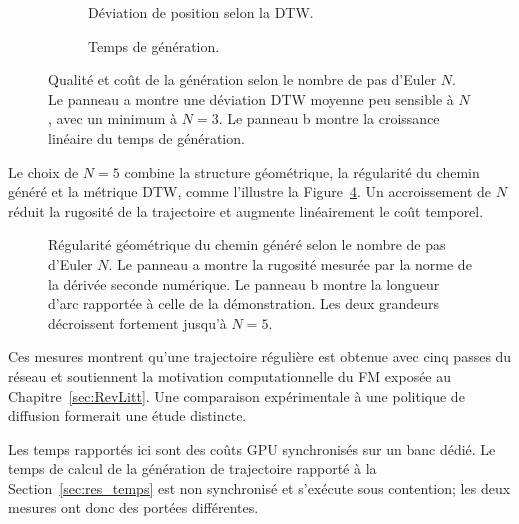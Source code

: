 \begin{figure}[!htbp]
    \centering
    \begin{subfigure}[b]{0.48\textwidth}
        \centering
        
        \caption{Déviation de position selon la \ac{DTW}.}\label{fig:fm_steps_dtw}
    \end{subfigure}
    \hfill
    \begin{subfigure}[b]{0.48\textwidth}
        \centering
        
        \caption{Temps de génération.}\label{fig:fm_steps_temps}
    \end{subfigure}
    \caption[Qualité et coût de la génération selon les pas d'Euler]{Qualité et coût de la génération selon le nombre de pas d'Euler $N$. Le panneau a montre une déviation \ac{DTW} moyenne peu sensible à $N$, avec un minimum à $N=3$. Le panneau b montre la croissance linéaire du temps de génération.}\label{fig:fm_euler_steps}
\end{figure}

Le choix de $N=5$ combine la structure géométrique, la régularité du chemin généré et la métrique \ac{DTW}, comme l'illustre la Figure~\ref{fig:fm_dispersion_structure}. Un accroissement de $N$ réduit la rugosité de la trajectoire et augmente linéairement le coût temporel.

\begin{figure}[!htbp]
    \centering
    
    \caption[Régularité géométrique du chemin selon les pas d'Euler]{Régularité géométrique du chemin généré selon le nombre de pas d'Euler $N$. Le panneau a montre la rugosité mesurée par la norme de la dérivée seconde numérique. Le panneau b montre la longueur d'arc rapportée à celle de la démonstration. Les deux grandeurs décroissent fortement jusqu'à $N=5$.}\label{fig:fm_dispersion_structure}
\end{figure}

Ces mesures montrent qu'une trajectoire régulière est obtenue avec cinq passes du réseau et soutiennent la motivation computationnelle du \ac{FM} exposée au Chapitre~\ref{sec:RevLitt}. Une comparaison expérimentale à une politique de diffusion formerait une étude distincte.

Les temps rapportés ici sont des coûts \ac{GPU} synchronisés sur un banc dédié. Le temps de calcul de la génération de trajectoire rapporté à la Section~\ref{sec:res_temps} est non synchronisé et s'exécute sous contention; les deux mesures ont donc des portées différentes.   

